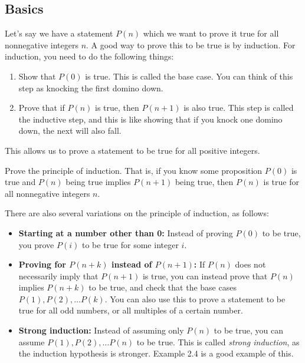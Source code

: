 \documentclass{article}
\newcommand{\skipline}{\vspace{2mm}}
\begin{document}
\subsection{Basics}
Let's say we have a statement $P(n)$ which we want to prove it true for all nonnegative integers $n$. A good way to prove this to be true is by induction. For induction, you need to do the following things:
\begin{enumerate}
    \item Show that $P(0)$ is true. This is called the base case. You can think of this step as knocking the first domino down.
    \item Prove that if $P(n)$ is true, then $P(n+1)$ is also true. This step is called the inductive step, and this is like showing that if you knock one domino down, the next will also fall.
\end{enumerate}
This allows us to prove a statement to be true for all positive integers.
\begin{exam}
Prove the principle of induction. That is, if you know some proposition $P(0)$ is true and $P(n)$ being true implies $P(n+1)$ being true, then $P(n)$ is true for all nonnegative integers $n$.
\end{exam}
\skipline
\noindent
There are also several variations on the principle of induction, as follows:
\begin{itemize}
    \item \textbf{Starting at a number other than 0:} Instead of proving $P(0)$ to be true, you prove $P(i)$ to be true for some integer $i$.
    \item \textbf{Proving for $P(n+k)$ instead of $P(n+1)$:} If $P(n)$ does not necessarily imply that $P(n+1)$ is true, you can instead prove that $P(n)$ implies $P(n+k)$ to be true, and check that the base cases $P(1), P(2), \dots P(k)$. You can also use this to prove a statement to be true for all odd numbers, or all multiples of a certain number.
    \item \textbf{Strong induction:} Instead of assuming only $P(n)$ to be true, you can assume $P(1), P(2), \dots P(n)$ to be true. This is called \textit{strong induction}, as the induction hypothesis is stronger. Example 2.4 is a good example of this.
\end{itemize}
\end{document}
